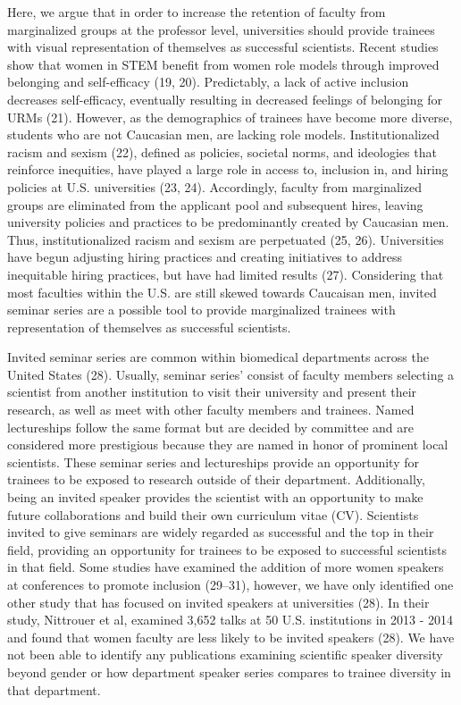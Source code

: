 \documentclass[10pt,]{article}
\begin{document}
Here, we argue that in order to increase the retention of faculty from
marginalized groups at the professor level, universities should provide
trainees with visual representation of themselves as successful
scientists. Recent studies show that women in STEM benefit from women
role models through improved belonging and self-efficacy (19, 20).
Predictably, a lack of active inclusion decreases self-efficacy,
eventually resulting in decreased feelings of belonging for URMs (21).
However, as the demographics of trainees have become more diverse,
students who are not Caucasian men, are lacking role models.
Institutionalized racism and sexism (22), defined as policies, societal
norms, and ideologies that reinforce inequities, have played a large
role in access to, inclusion in, and hiring policies at U.S.
universities (23, 24). Accordingly, faculty from marginalized groups are
eliminated from the applicant pool and subsequent hires, leaving
university policies and practices to be predominantly created by
Caucasian men. Thus, institutionalized racism and sexism are perpetuated
(25, 26). Universities have begun adjusting hiring practices and
creating initiatives to address inequitable hiring practices, but have
had limited results (27). Considering that most faculties within the
U.S. are still skewed towards Caucaisan men, invited seminar series are
a possible tool to provide marginalized trainees with representation of
themselves as successful scientists.

Invited seminar series are common within biomedical departments across
the United States (28). Usually, seminar series' consist of faculty
members selecting a scientist from another institution to visit their
university and present their research, as well as meet with other
faculty members and trainees. Named lectureships follow the same format
but are decided by committee and are considered more prestigious because
they are named in honor of prominent local scientists. These seminar
series and lectureships provide an opportunity for trainees to be
exposed to research outside of their department. Additionally, being an
invited speaker provides the scientist with an opportunity to make
future collaborations and build their own curriculum vitae (CV).
Scientists invited to give seminars are widely regarded as successful
and the top in their field, providing an opportunity for trainees to be
exposed to successful scientists in that field. Some studies have
examined the addition of more women speakers at conferences to promote
inclusion (29--31), however, we have only identified one other study
that has focused on invited speakers at universities (28). In their
study, Nittrouer et al, examined 3,652 talks at 50 U.S. institutions in
2013 - 2014 and found that women faculty are less likely to be invited
speakers (28). We have not been able to identify any publications
examining scientific speaker diversity beyond gender or how department
speaker series compares to trainee diversity in that department.
\end{document}
